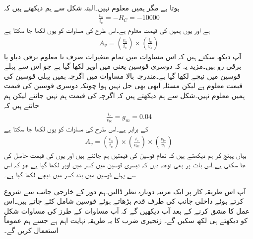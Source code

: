 ہوتا ہے مگر ہمیں معلوم نہیں۔البتہ شکل سے ہم دیکھتے ہیں کہ
\begin{align*}
\frac{v_o}{i_c}=-R_C=\num{-10000}
\end{align*}
ہے اور یوں ہمیں  کی قیمت معلوم ہے۔اس طرح  کی مساوات کو یوں لکھا جا سکتا ہے
\begin{align*}
A_v = \left(\frac{v_o}{i_c} \right ) \times \left(\frac{i_c}{v_s} \right )
\end{align*}
آپ دیکھ سکتے ہیں کہ اس مساوات میں تمام متغیرات صرف نا معلوم برقی دباو یا برقی رو ہیں۔مزید یہ کہ دوسری قوسین یعنی  میں اوپر   لکھا گیا ہے جو اس سے پہلے قوسین میں نیچے لکھا گیا ہے۔مندرجہ بالا مساوات میں اگرچہ ہمیں پہلی قوسین کی قیمت معلوم ہے لیکن مسئلہ ابھی بھی حل نہیں ہوا چونکہ دوسری قوسین کی قیمت ہمیں معلوم نہیں۔شکل سے ہم دیکھتے ہیں کہ اگرچہ   کی قیمت ہم نہیں جانتے لیکن ہم جانتے ہیں کہ
\begin{align*}
\frac{i_c}{v_{be}}=g_m=\num{0.04}
\end{align*}
کے برابر ہے۔اس طرح   کی مساوات کو یوں لکھا جا سکتا ہے
\begin{align*}
A_v=\left(\frac{v_o}{i_c} \right ) \times \left(\frac{i_c}{v_{be}} \right ) \times \left(\frac{v_{be}}{v_s} \right ) 
\end{align*}
یہاں پہنچ کر ہم دیکھتے ہیں کہ تمام قوسین کی قیمتیں ہم جانتے ہیں اور یوں  کی قیمت حاصل کی جا سکتی ہے۔اس بات پر بھی توجہ دیں کہ تیسری قوسین میں کسر میں اوپر  لکھا گیا ہے جو کہ اس سے پہلے قوسین میں بند کسر میں نیچے لکھا گیا ہے۔

آپ اس طریقہ کار پر ایک مرتبہ دوبارہ نظر ڈالیں۔ہم دور کے خارجی جانب   سے شروع کرتے ہوئے داخلی جانب   کی طرف قدم بڑھاتے ہوئے قوسین شامل کئے جاتے ہیں۔اس عمل کا مشق کرنے کے بعد آپ دیکھیں گے کہ آپ مساوات   کے طرز کی مساوات شکل کو دیکھتے ہی لکھ سکیں گے۔ زنجیری ضرب کا یہ طریقہ نہایت اہم ہے جسے ہم عموماً استعمال کریں گے۔

